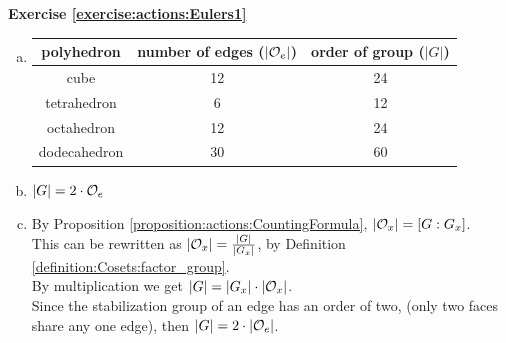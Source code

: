 \noindent\textbf{Exercise \ref{exercise:actions:Eulers1}}
\begin{enumerate}[(a)]
\item
%
\begin{tabular}{|c | c | c|}\hline
polyhedron & number of edges ($|{\cal O}_e|$) & order of group ($|G|$)\\ \hline
cube &  12 &   24\\ \hline
tetrahedron &  6&   12\\ \hline
octahedron & 12 &24\\ \hline
dodecahedron &  30&60\\ \hline 
\end{tabular}

\item
$|G| = 2 \cdot {\cal O}_e$

\item 
By Proposition \ref{proposition:actions:CountingFormula}, $|{\cal O}_x| = [G : G_x]$.  
\\
This can be rewritten as $|{\cal O}_x| = \frac{|G|}{|{G_x|}}$, by Definition \ref{definition:Cosets:factor_group}.
\\
By multiplication we get $|G| = |G_x| \cdot |{\cal O}_x|$. 
\\
Since the stabilization group of an edge has an order of two, (only two faces share any one edge), then $|G| = 2 \cdot |{\cal O}_e|$.
\end{enumerate}

